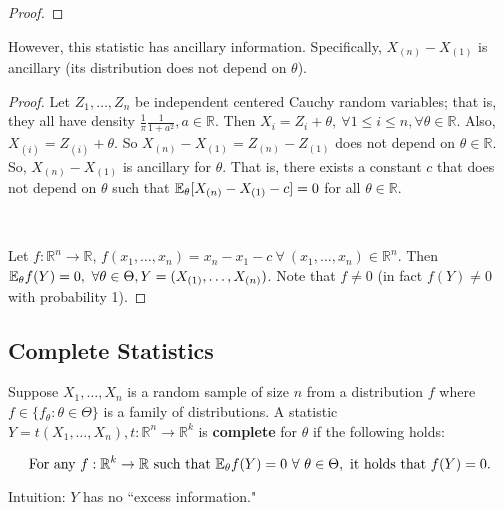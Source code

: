 \begin{example}
\begin{proof}
\end{proof}

However, this statistic has ancillary information. Specifically, \(X_{(n)} - X_{(1)}\) is ancillary (its distribution does not depend on \(\theta\)).

\begin{proof} Let \(Z_1, \ldots, Z_n\) be independent centered Cauchy random variables; that is, they all have density \(\frac{1}{\pi} \frac{1}{1+a^2}, a \in \mathbb{R}\). Then \(X_i = Z_i + \theta, \ \forall 1 \leq i \leq n, \forall \theta \in \mathbb{R}\). Also, \(X_{(i)} = Z_{(i)} + \theta\). So \(X_{(n)} - X_{(1)} = Z_{(n)} - Z_{(1)}\) does not depend on \(\theta \in \mathbb{R}\). So, \(X_{(n)} - X_{(1)}\) is ancillary for \(\theta\). That is, there exists a constant \(c\) that does not depend on \(\theta\) such that \(\E_\theta[X_{(n)} - X_{(1)} - c] = 0\) for all \(\theta \in \mathbb{R}\). 

\

Let \(f: \mathbb{R}^n \to \mathbb{R}\), \(f(x_1, \ldots, x_n) = x_n - x_1 - c \ \forall \ (x_1, \ldots, x_n) \in \mathbb{R}^n\). Then \(\E_\theta f(Y) = 0, \ \forall \theta \in \Theta, Y  = (X_{(1)}, \ldots, X_{(n)})\). Note that \(f \neq 0\) (in fact \(f(Y) \neq 0\) with probability 1).

\end{proof}

\end{example}

\subsection{Complete Statistics}

\begin{definition}Suppose \(X_1, \ldots, X_n\) is a random sample of size \(n\) from a distribution \(f\) where \(f \in \{f_\theta: \theta \in \Theta\}\) is a family of distributions. A statistic \(Y = t(X_1, \ldots, X_n), t: \mathbb{R}^n \to \mathbb{R}^k\) is \textbf{complete} for \(\theta\) if the following holds:

\[
\text{For any } f: \mathbb{R}^k \to \mathbb{R} \text{ such that } \E_\theta f(Y) = 0 \ \forall \ \theta \in \Theta, \text{ it holds that } f(Y) = 0.
\]

Intuition: \(Y\) has no ``excess information."

\end{definition}

